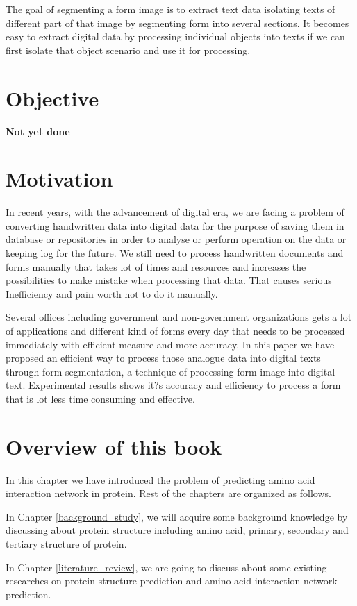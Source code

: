 The goal of segmenting a form image is to extract text data isolating texts of different part of that image by segmenting form into several sections. It becomes easy to extract digital data by processing individual objects into texts if we can first isolate that object scenario and use it for processing.
\section{Objective}
	\textbf{Not yet done}
\section{Motivation}
In recent years, with the advancement of digital era, we are facing a problem of converting handwritten data into digital data for the purpose of saving them in database or repositories in order to analyse or perform operation on the data or keeping log for the future. We still need to process handwritten documents and forms manually that takes lot of times and resources and increases the possibilities to make mistake when processing that data. That causes serious Inefficiency and pain worth not to do it manually.

Several offices including government and non-government organizations gets a lot of applications and different kind of forms every day that needs to be processed immediately with efficient measure and more accuracy. 
In this paper we have proposed an efficient way to process those analogue data into digital texts through form segmentation, a technique of processing form image into digital text. Experimental results shows it?s accuracy and efficiency to process a form that is lot less time consuming and effective.  

\section{Overview of this book}
In this chapter we have introduced the problem of predicting amino acid interaction network in protein. Rest of the chapters are organized as follows.

In Chapter \ref{background_study}, we will acquire some background knowledge by discussing about protein structure including amino acid, primary, secondary and tertiary structure of protein.

In Chapter \ref{literature_review}, we are going to discuss about some existing researches on protein structure prediction and amino acid interaction network prediction.

